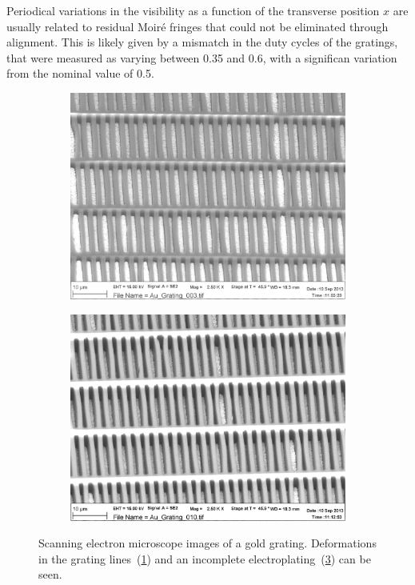 Periodical variations in the visibility as a function of the transverse
position $x$ are usually related to residual Moir\'e fringes that could not
be eliminated through alignment. This is likely given by a mismatch in the
duty cycles of the gratings, that were measured as varying between 
\num{0.35} and \num{0.6}, with a significan variation from the nominal value
of \num{0.5}.

\begin{figure}[htb]
    \centering
    \begin{subfigure}[b]{.49\textwidth}
    \centering
    \includegraphics[width=\textwidth]{gfx/Au_Grating_003.png}
    \caption{}
    \label{fig:deformazioni}
    \end{subfigure}
    \hfill
    \begin{subfigure}[b]{.49\textwidth}
    \centering
    \includegraphics[width=\textwidth]{gfx/Au_Grating_010.png}
    \caption{}
    \label{fig:galvanizzazione}
    \end{subfigure}
    \caption[Electron microscope images of a gold grating.]{Scanning
        electron microscope images of a gold grating.
        Deformations in the grating lines~(\ref{fig:deformazioni}) and an
        incomplete electroplating~(\ref{fig:galvanizzazione}) can be seen.
    }
\end{figure}

